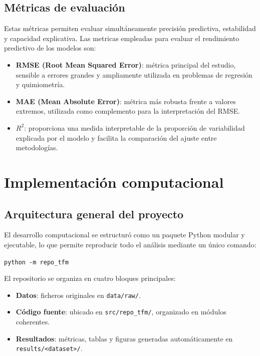 \documentclass[12pt,a4paper]{report}
\begin{document}
\section{Métricas de evaluación}

Estas métricas permiten evaluar simultáneamente precisión predictiva, estabilidad y 
capacidad explicativa. Las metricas empleadas para evaluar el rendimiento predictivo de los modelos son:

\begin{itemize}
    \item \textbf{RMSE (Root Mean Squared Error)}: métrica principal del estudio, sensible 
    a errores grandes y ampliamente utilizada en problemas de regresión y quimiometría.

    \item \textbf{MAE (Mean Absolute Error)}: métrica más robusta frente a valores 
    extremos, utilizada como complemento para la interpretación del RMSE.

    \item \textbf{$R^{2}$}: proporciona una medida interpretable de la proporción de 
    variabilidad explicada por el modelo y facilita la comparación del ajuste entre 
    metodologías.
\end{itemize}


\chapter{Implementación computacional}

\section{Arquitectura general del proyecto}

El desarrollo computacional se estructuró como un paquete Python modular y ejecutable, lo que permite reproducir todo el análisis mediante un único comando:

\begin{center}
\texttt{python -m repo\_tfm}
\end{center}

El repositorio se organiza en cuatro bloques principales:

\begin{itemize}
    \item \textbf{Datos}: ficheros originales en \texttt{data/raw/}.
    
    \item \textbf{Código fuente}: ubicado en \texttt{src/repo\_tfm/}, organizado en módulos coherentes.
    
    \item \textbf{Resultados}: métricas, tablas y figuras generadas automáticamente en \texttt{results/<dataset>/}.
    
\end{itemize}
\end{document}
